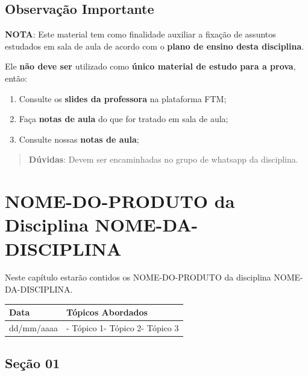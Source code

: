 \documentclass[
]{book}
\providecommand{\tightlist}{%
  \setlength{\itemsep}{0pt}\setlength{\parskip}{0pt}}
\begin{document}
\hypertarget{observauxe7uxe3o-importante}{%
\section{Observação Importante}\label{observauxe7uxe3o-importante}}

\textbf{NOTA}: Este material tem como finalidade auxiliar a fixação de assuntos estudados em sala de aula de acordo com o \textbf{plano de ensino desta disciplina}.

Ele \textbf{não deve ser} utilizado como \textbf{único material de estudo para a prova}, então:

\begin{enumerate}
\def\labelenumi{\arabic{enumi}.}
\tightlist
\item
  Consulte os \textbf{slides da professora} na plataforma FTM;\\
\item
  Faça \textbf{notas de aula} do que for tratado em sala de aula;\\
\item
  Consulte nossas \textbf{notas de aula};
\end{enumerate}

\begin{quote}
\textbf{Dúvidas}: Devem ser encaminhadas no grupo de whatsapp da disciplina.
\end{quote}

\hypertarget{nome-do-produto-da-disciplina-nome-da-disciplina}{%
\chapter{NOME-DO-PRODUTO da Disciplina NOME-DA-DISCIPLINA}\label{nome-do-produto-da-disciplina-nome-da-disciplina}}

Neste capítulo estarão contidos os NOME-DO-PRODUTO da disciplina NOME-DA-DISCIPLINA.

\begin{longtable}[]{@{}ll@{}}
\toprule()
Data & Tópicos Abordados \\
\midrule()
\endhead
dd/mm/aaaa & - Tópico 1- Tópico 2- Tópico 3 \\
\bottomrule()
\end{longtable}

\hypertarget{seuxe7uxe3o-01}{%
\section{Seção 01}\label{seuxe7uxe3o-01}}
\end{document}
